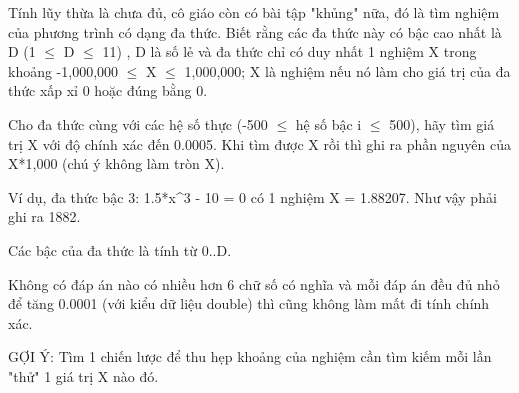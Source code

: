Tính lũy thừa là chưa đủ, cô giáo còn có bài tập "khủng" nữa, đó là tìm nghiệm của phương trình có dạng đa thức. Biết rằng các đa thức này có bậc cao nhất là D (1  $\le$  D  $\le$  11) , D là số lẻ và đa thức chỉ có duy nhất 1 nghiệm X trong khoảng -1,000,000  $\le$  X  $\le$  1,000,000; X là nghiệm nếu nó làm cho giá trị của đa thức xấp xỉ 0 hoặc đúng bằng 0.  

   Cho đa thức cùng với các hệ số thực (-500  $\le$  hệ số bậc i  $\le$  500), hãy tìm giá trị X với độ chính xác đến 0.0005. Khi tìm được X rồi thì ghi ra phần nguyên của X*1,000 (chú ý không làm tròn X).  

   Ví dụ, đa thức bậc 3: 1.5*x^3 - 10 = 0 có 1 nghiệm X = 1.88207. Như vậy phải ghi ra 1882.  

   Các bậc của đa thức là tính từ 0..D.   




   Không có đáp án nào có nhiều hơn 6 chữ số có nghĩa và mỗi đáp án đều đủ nhỏ  để tăng 0.0001 (với kiểu dữ liệu double) thì cũng không làm mất đi tính chính xác.  

   GỢI Ý: Tìm 1 chiến lược để thu hẹp khoảng của nghiệm cần tìm kiếm mỗi lần "thử" 1 giá trị X nào đó.
